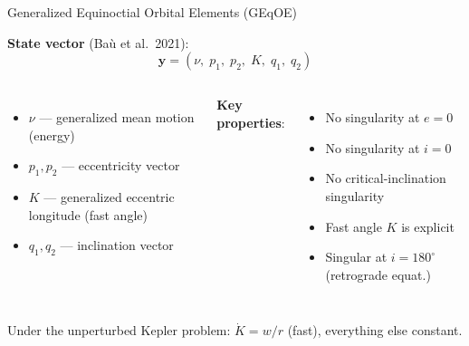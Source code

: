 \documentclass[aspectratio=169, 11pt]{beamer}
\newcommand{\good}[1]{\textcolor{darkgreen}{#1}}
\newcommand{\bad}[1]{\textcolor{highlight}{#1}}
\begin{document}
\begin{frame}{Generalized Equinoctial Orbital Elements (GEqOE)}

\textbf{State vector} (Ba\`u et al.\ 2021):
\[
\bm y = (\nu,\; p_1,\; p_2,\; K,\; q_1,\; q_2)
\]

\begin{columns}[T]
\begin{itemize}
    \item $\nu$ --- generalized mean motion (energy)
    \item $p_1, p_2$ --- eccentricity vector
    \item $K$ --- generalized eccentric longitude (\alert{fast angle})
    \item $q_1, q_2$ --- inclination vector
\end{itemize}

\textbf{Key properties}:
\begin{itemize}
    \item[\good{$\checkmark$}] No singularity at $e = 0$
    \item[\good{$\checkmark$}] No singularity at $i = 0$
    \item[\good{$\checkmark$}] No critical-inclination singularity
    \item[\good{$\checkmark$}] Fast angle $K$ is explicit
    \item[\bad{$\times$}] Singular at $i = 180^\circ$ (retrograde equat.)
\end{itemize}
\end{columns}

\vspace{0.5em}
Under the unperturbed Kepler problem: $\dot K = w/r$ (fast),
everything else constant.

\end{frame}
\end{document}
